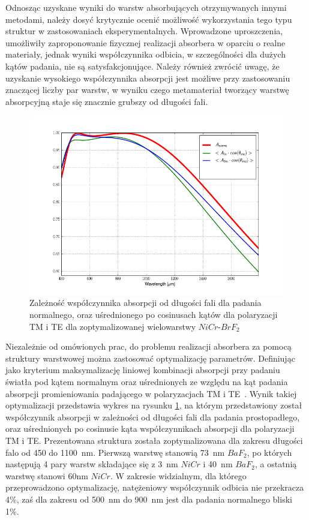 Odnosząc uzyskane wyniki do warstw absorbujących otrzymywanych innymi metodami, należy dosyć krytycznie ocenić możliwość wykorzystania tego typu struktur w zastosowaniach eksperymentalnych. Wprowadzone uproszczenia, umożliwiły zaproponowanie fizycznej realizacji absorbera w oparciu o realne materiały, jednak wyniki współczynnika odbicia, w szczególności dla dużych kątów padania, nie są satysfakcjonujące. Należy również zwrócić uwagę, że uzyskanie wysokiego współczynnika absorpcji jest możliwe przy zastosowaniu znaczącej liczby par warstw, w wyniku czego metamateriał tworzący warstwę absorpcyjną staje się znacznie grubszy od długości fali. 

\begin{figure}[tb]
	\includegraphics[width=\textwidth]{images/pml/optiabsorb.png}
	\caption{Zależność współczynnika absorpcji od długości fali dla padania normalnego, oraz uśrednionego po cosinusach kątów dla polaryzacji TM i TE dla zoptymalizowanej wielowarstwy $NiCr$-$BrF_2$}
	\label{fig:optimulti}
\end{figure}

Niezależnie od omówionych prac, do problemu realizacji absorbera za pomocą struktury warstwowej można zastosować optymalizację parametrów. Definiując jako kryterium maksymalizację  liniowej kombinacji absorpcji przy padaniu światła pod kątem normalnym oraz uśrednionych ze względu na kąt padania absorpcji promieniowania padającego w polaryzacjach TM i TE~\cite{stefaniuk2015perfectly}. Wynik takiej optymalizacji przedstawia wykres na rysunku \ref{fig:optimulti}, na którym przedstawiony został współczynnik absorpcji w zależności od długości fali dla padania prostopadłego, oraz uśrednionych po cosinusie kąta współczynnikach absorpcji dla polaryzacji TM i TE. Prezentowana struktura została zoptymalizowana dla zakresu długości falo od 450 do 1100~nm. Pierwszą warstwę stanowią 73~nm $BaF_2$, po których następują 4 pary warstw składające się z 3~nm $NiCr$ i 40~nm $BaF_2$, a ostatnią warstwę stanowi 60nm $NiCr$. W zakresie widzialnym, dla którego przeprowadzono optymalizację, natężeniowy współczynnik odbicia nie przekracza 4\%, zaś dla zakresu od 500~nm do 900~nm jest dla padania normalnego bliski 1\%.
